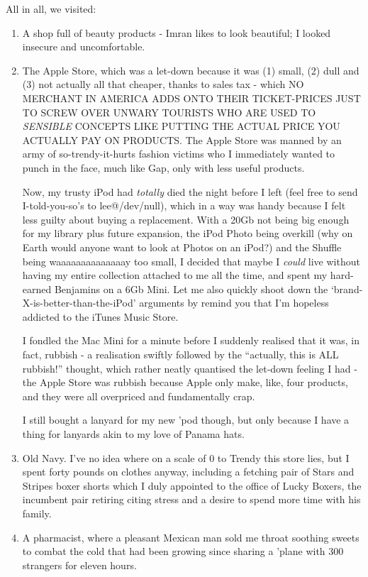 \documentclass[a5paper,10pt,titlepage,draft]{book}
\begin{document}
All in all, we visited:
\begin{enumerate}
\item A shop full of beauty products - Imran likes to look beautiful; I looked insecure and uncomfortable.
\item The Apple Store, which was a let-down because it was (1) small, (2) dull and (3) not actually all that cheaper, thanks to sales tax - which NO MERCHANT IN AMERICA ADDS ONTO THEIR TICKET-PRICES JUST TO SCREW OVER UNWARY TOURISTS WHO ARE USED TO \emph{SENSIBLE} CONCEPTS LIKE PUTTING THE ACTUAL PRICE YOU ACTUALLY PAY ON PRODUCTS.  The Apple Store was manned by an army of so-trendy-it-hurts fashion victims who I immediately wanted to punch in the face, much like Gap, only with less useful products.

Now, my trusty iPod had \emph{totally} died the night before I left (feel free to send I-told-you-so's to lee@/dev/null), which in a way was handy because I felt less guilty about buying a replacement.  With a 20Gb not being big enough for my library plus future expansion, the iPod Photo being overkill (why on Earth would anyone want to look at Photos on an iPod?) and the Shuffle being waaaaaaaaaaaaaay too small, I decided that maybe I \emph{could} live without having my entire collection attached to me all the time, and spent my hard-earned Benjamins on a 6Gb Mini.  Let me also quickly shoot down the `brand-X-is-better-than-the-iPod' arguments by remind you that I'm hopeless addicted to the iTunes Music Store.

I fondled the Mac Mini for a minute before I suddenly realised that it was, in fact, rubbish - a realisation swiftly followed by the ``actually, this is ALL rubbish!'' thought, which rather neatly quantised the let-down feeling I had - the Apple Store was rubbish because Apple only make, like, four products, and they were all overpriced and fundamentally crap.

I still bought a lanyard for my new 'pod though, but only because I have a thing for lanyards akin to my love of Panama hats. 

\item Old Navy.  I've no idea where on a scale of 0 to Trendy this store lies, but I spent forty pounds on clothes anyway, including a fetching pair of Stars and Stripes boxer shorts which I duly appointed to the office of Lucky Boxers, the incumbent pair retiring citing stress and a desire to spend more time with his family.

\item A pharmacist, where a pleasant Mexican man sold me throat soothing sweets to combat the cold that had been growing since sharing a 'plane with 300 strangers for eleven hours.


\end{enumerate}
\end{document}
